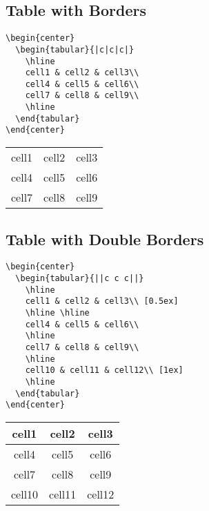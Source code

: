 \documentclass[10pt, letterpaper]{article}
\begin{document}
\subsection{Table with Borders}
\begin{multicols}{2}
\lstset{style=basicstyle}
\begin{lstlisting}[]
\begin{center}
  \begin{tabular}{|c|c|c|}
    \hline
    cell1 & cell2 & cell3\\
    cell4 & cell5 & cell6\\
    cell7 & cell8 & cell9\\
    \hline
  \end{tabular}
\end{center}
\end{lstlisting}
\columnbreak
\begin{center}
  \begin{tabular}{|c|c|c|}
    \hline
    cell1 & cell2 & cell3\\
    cell4 & cell5 & cell6\\
    cell7 & cell8 & cell9\\
    \hline
  \end{tabular}
\end{center}
\end{multicols}

\subsection{Table with Double Borders}
\begin{multicols}{2}
\lstset{style=basicstyle}
\begin{lstlisting}[]
\begin{center}
  \begin{tabular}{||c c c||}
    \hline
    cell1 & cell2 & cell3\\ [0.5ex]
    \hline \hline
    cell4 & cell5 & cell6\\
    \hline
    cell7 & cell8 & cell9\\
    \hline
    cell10 & cell11 & cell12\\ [1ex]
    \hline
  \end{tabular}
\end{center}
\end{lstlisting}
\columnbreak
\begin{center}
  \begin{tabular}{||c c c||}
    \hline
    cell1 & cell2 & cell3\\ [0.5ex]
    \hline \hline
    cell4 & cell5 & cell6\\
    \hline
    cell7 & cell8 & cell9\\
    \hline
    cell10 & cell11 & cell12\\ [1ex]
    \hline
  \end{tabular}
\end{center}
\end{multicols}
\end{document}
